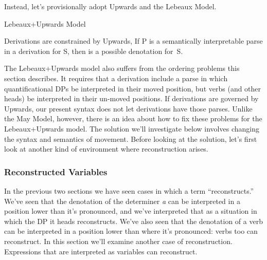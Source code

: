 Instead, let's provisionally adopt Upwards and the Lebeaux Model. 
\begin{exe}
\raggedright
	\ex \label{ex6:lebv} Lebeaux+Upwards Model
	\begin{xlist}
		\ex Derivations are constrained by Upwards,
		\ex If P is a semantically interpretable parse in a derivation for S, then  is a possible denotation for~S.
	\end{xlist}
\end{exe}
The Lebeaux+Upwards model also suffers from the ordering problems this section describes. It requires that a derivation include a parse in which quantificational DPs be interpreted in their moved position, but verbs (and other heads) be interpreted in their un-moved positions. If derivations are governed by Upwards, our present syntax does not let derivations have those parses. Unlike the May Model, however, there is an idea about how to fix these problems for the Lebeaux+Upwards model. The solution we'll investigate below involves changing the syntax and semantics of movement. Before looking at the solution, let's first look at another kind of environment where reconstruction arises.

\subsubsection{Reconstructed Variables}
\label{sec:reconvariable}

In the previous two sections we have seen cases in which a term ``reconstructs.'' We've seen that the denotation of the determiner \emph{a} can be interpreted in a position lower than it's pronounced, and we've interpreted that as a situation in which the DP it heads reconstructs. We've also seen that the denotation of a verb can be interpreted in a position lower than where it's pronounced: verbs too can reconstruct. In this section we'll examine another case of reconstruction. Expressions that are interpreted as variables can reconstruct.

